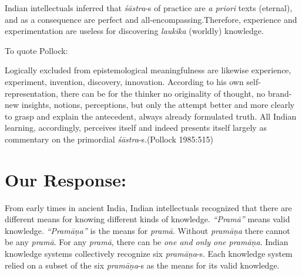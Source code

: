 Indian intellectuals inferred that {{\sl śāstra}\relax}-s of practice are {\sl a priori} texts (eternal), and as a consequence are perfect and all-encompassing.\break  Therefore, experience and experimentation are useless for discovering {{\sl laukika}\relax} (worldly) knowledge.

To quote Pollock:
\begin{myquote}
Logically excluded from epistemological meaningfulness are likewise experience, experiment, invention, discovery, innovation.  According to his own self-representation, there can be for the thinker no originality of thought, no brand-new insights, notions, perceptions, but only the attempt better and more clearly to grasp and explain the antecedent, always already formulated truth. All Indian learning, accordingly, perceives itself and indeed presents itself largely as commentary on the primordial {\sl śāstra}-s.\hfill (Pollock 1985:515)
\end{myquote}

\section*{Our Response:}

From early times in ancient India, Indian intellectuals recognized that there are different means for knowing different kinds of knowledge. {\sl ``Pramā''} means valid knowledge.  {\sl ``Pramāṇa''} is the means for {\sl pramā}.  Without {\sl pramāṇa} there cannot be any {\sl pramā}.  For any {\sl pramā}, there can be {\sl one and only one pramāṇa}.  Indian knowledge systems collectively recognize six {\sl pramāṇa}-s. Each knowledge system relied on a subset of the six {\sl pramāṇa}-s as the means for its valid knowledge.

